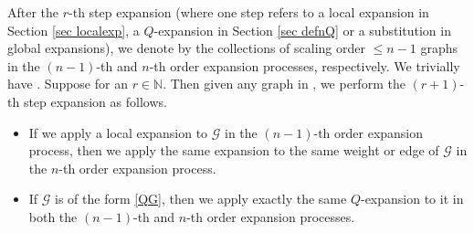 \documentclass{article}
\newcommand{\1}{\mathds{1}}
\numberwithin{equation}{section}
\renewcommand{\cal}{\mathcal}
\renewcommand{\leq}{\leqslant}
\renewcommand{\geq}{\geqslant}
\renewcommand{\le}{\leq}
\renewcommand{\ge}{\geq}
\newcommand{\N}{\mathbb{N}}
\theoremstyle{plain} %
\theoremstyle{remark}
\begin{document}
After the $r$-th step expansion (where one step refers to a local expansion in Section \ref{sec localexp}, a $Q$-expansion in Section \ref{sec defnQ} or a substitution in global expansions), we denote by  the collections of scaling order $\le n-1$ graphs in the $(n-1)$-th and $n$-th order expansion processes, respectively. We trivially have . Suppose  for an $r\in \N$. Then given any graph in \smash{$\cal G \in \mathfrak G^{(n-1)}_r$}, we perform the $(r+1)$-th step expansion as follows.
\begin{itemize}


\item If we apply a local expansion to $\cal G$ in the $(n-1)$-th order expansion process, then we apply the same expansion to the same weight or edge of $\cal G$ in the $n$-th order expansion process. 

\item If $\cal G$ is of the form \eqref{QG}, then we apply exactly the same $Q$-expansion to it in both the $(n-1)$-th and $n$-th order expansion  processes. 


\end{itemize}
\end{document}
